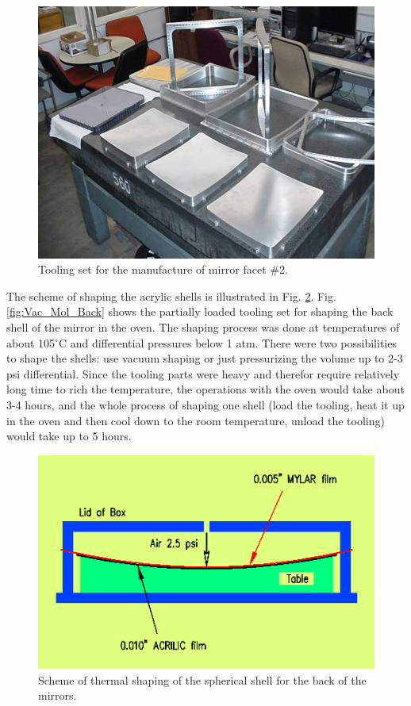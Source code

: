 \begin{figure}[ht]
    \centering
    \includegraphics[width=1.0\linewidth]{images/Tool_on_tbl.jpg}
    \caption{Tooling set for the manufacture of mirror facet \#2.}
    \label{fig:Tool_on_tbl}
\end{figure}

\indent The scheme of shaping the acrylic shells is illustrated in  Fig. \ref{fig:Shaping_new}. Fig. \ref{fig:Vac_Mol_Back} shows the partially loaded tooling set for shaping the back shell of the mirror in the oven. The shaping process was done at temperatures of about 105$^\circ$C and differential pressures below 1 atm. There were two possibilities to shape the shells: use vacuum shaping or just pressurizing the volume up to 2-3 psi differential. Since the tooling parts were heavy and therefor require relatively long time to rich the temperature, the operations with the oven would take about 3-4 hours, and the whole process of shaping one shell (load the tooling, heat it up in the oven and then cool down to the room temperature, unload the tooling) would take up to 5 hours.

\begin{figure}[ht]
    \centering
    \includegraphics[width=1.0\linewidth]{images/Shaping_new.png}
    \caption{Scheme of thermal shaping of the spherical shell for the back of the mirrors.}
    \label{fig:Shaping_new}
\end{figure}

